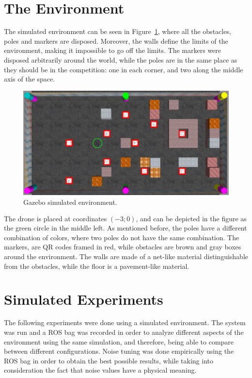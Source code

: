 \section{The Environment}
\label{sec:chapter3:environment}
The simulated environment can be seen in Figure~\ref{fig:chapter3:env:gazebo}, where all the obstacles, poles and markers are disposed. Moreover, the walls define the limits of the environment, making it impossible to go off the limits. The markers were disposed arbitrarily around the world, while the poles are in the same place as they should be in the competition: one in each corner, and two along the middle axis of the space.
\begin{figure}
\centering
\includegraphics[width=\textwidth]{Images/fig18-gazebo-environment}
\caption{Gazebo simulated environment.}
\label{fig:chapter3:env:gazebo}
\end{figure}
The drone is placed at coordinates $(-3;0)$, and can be depicted in the figure as the green circle in the middle left. As mentioned before, the poles have a different combination of colors, where two poles do not have the same combination. The markers, are QR codes framed in red, while obstacles are brown and gray boxes around the environment. The walls are made of a net-like material distinguishable from the obstacles, while the floor is a pavement-like material.

\section{Simulated Experiments}
\label{sec:chapter3:simulation}
The following experiments were done using a simulated environment. The system was run and a \ac{ROS} bag was recorded in order to analyze different aspects of the environment using the same simulation, and therefore, being able to compare between different configurations. Noise tuning was done empirically using the \ac{ROS} bag in order to obtain the best possible results, while taking into consideration the fact that noise values have a physical meaning.\\

